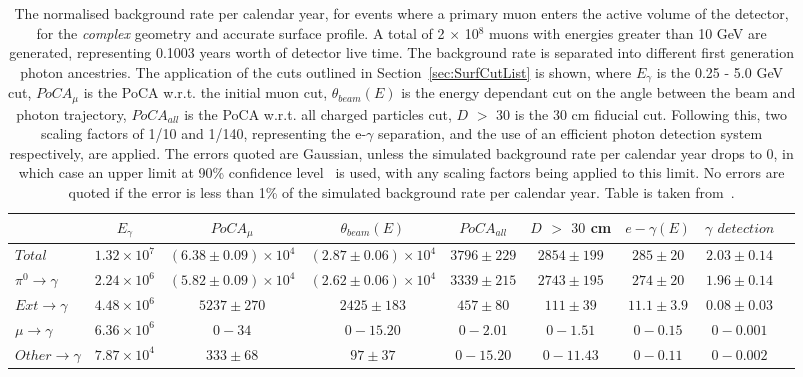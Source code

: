 \begin{table}
  \caption[The normalised background rate per calendar year, for events where a primary muon enters the active volume of the detector, for the \emph{complex} geometry and accurate surface profile]
          {The normalised background rate per calendar year, for events where a primary muon enters the active volume of the detector, for the \emph{complex} geometry and accurate surface profile. A total of 2 $\times$ 10$^8$ muons with energies greater than 10 GeV are generated, representing 0.1003 years worth of detector live time. The background rate is separated into different first generation photon ancestries. The application of the cuts outlined in Section~\ref{sec:SurfCutList} is shown, where $E_\gamma$ is the 0.25 - 5.0 GeV cut, $PoCA_\mu$ is the PoCA w.r.t. the initial muon cut, $\theta_{beam}(E)$ is the energy dependant cut on the angle between the beam and photon trajectory, $PoCA_{all}$ is the PoCA w.r.t. all charged particles cut, $D$ $>$ $30$ is the 30 cm fiducial cut. Following this, two scaling factors of 1/10 and 1/140, representing the e-$\gamma$ separation, and the use of an efficient photon detection system respectively, are applied. The errors quoted are Gaussian, unless the simulated background rate per calendar year drops to 0, in which case an upper limit at 90\% confidence level~\citep{PhysRevD.57.3873} is used, with any scaling factors being applied to this limit. No errors are quoted if the error is less than 1\% of the simulated background rate per calendar year. Table is taken from~\citep{MartinsThesis}.}
  \label{tab:SurfMuComp}
  \centering
  \scriptsize
  \begin{tabular}{l c c c c c c c c }
    \toprule
        & $E_\gamma$ & $PoCA_\mu$ & $\theta_{beam}(E)$ & $PoCA_{all}$ & $D$ $>$ $30$ cm & $e-\gamma(E)$ & $\gamma$ $detection$ \\
        \midrule
        $Total$          & $1.32\times10^7$ & $(6.38\pm0.09)\times10^4$ & $(2.87\pm0.06)\times10^4$ & $3796\pm229$ & $2854\pm199$ & $285\pm20$   & $2.03\pm0.14$ \\

        $\pi^0\to\gamma$ & $2.24\times10^6$ & $(5.82\pm0.09)\times10^4$ & $(2.62\pm0.06)\times10^4$ & $3339\pm215$ & $2743\pm195$ & $274\pm20$   & $1.96\pm0.14$ \\

        $Ext\to\gamma$   & $4.48\times10^6$ & $5237\pm270$              & $2425\pm183$              & $457\pm80$   & $111\pm39$   & $11.1\pm3.9$ & $0.08\pm0.03$ \\

        $\mu\to\gamma$   & $6.36\times10^6$ & $0-34$                    & $0-15.20$                 & $0-2.01$     & $0-1.51$     & $0-0.15$     & $0-0.001$ \\

        $Other\to\gamma$ & $7.87\times10^4$ & $333\pm68$                & $97\pm37$                 & $0-15.20$    & $0-11.43$    & $0-0.11$     & $0-0.002$ \\
        \bottomrule
  \end{tabular}
\end{table}

